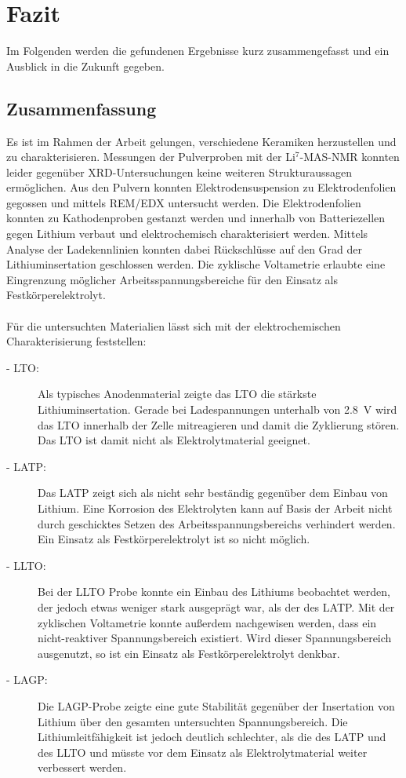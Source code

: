 \documentclass[a4paper, 11pt, headsepline,footsepline,twoside,abstract]{scrbook}
\begin{document}
\chapter{Fazit}
Im Folgenden werden die gefundenen Ergebnisse kurz zusammengefasst und ein Ausblick in die Zukunft gegeben.
\section{Zusammenfassung}
Es ist im Rahmen der Arbeit gelungen, verschiedene Keramiken herzustellen und zu charakterisieren. Messungen der Pulverproben mit der Li$^7$-MAS-NMR konnten leider gegenüber XRD-Untersuchungen keine weiteren Strukturaussagen ermöglichen. Aus den Pulvern konnten Elektrodensuspension zu Elektrodenfolien gegossen und mittels REM/EDX untersucht werden. Die Elektrodenfolien konnten zu Kathodenproben gestanzt werden und innerhalb von Batteriezellen gegen Lithium verbaut und elektrochemisch charakterisiert werden. Mittels Analyse der Ladekennlinien konnten dabei Rückschlüsse auf den Grad der Lithiuminsertation geschlossen werden. Die zyklische Voltametrie erlaubte eine Eingrenzung möglicher Arbeitsspannungsbereiche für den Einsatz als Festkörperelektrolyt. %
\\\\
Für die untersuchten Materialien lässt sich mit der elektrochemischen Charakterisierung feststellen:
\begin{description}
\item[- LTO:] Als typisches Anodenmaterial zeigte das LTO die stärkste Lithiuminsertation. Gerade bei Ladespannungen unterhalb von \SI{2.8}{\volt} wird das LTO innerhalb der Zelle mitreagieren und damit die Zyklierung stören. Das LTO ist damit nicht als Elektrolytmaterial geeignet.
\item[- LATP:] Das LATP zeigt sich als nicht sehr beständig gegenüber dem Einbau von Lithium. Eine Korrosion des Elektrolyten kann auf Basis der Arbeit nicht durch geschicktes Setzen des Arbeitsspannungsbereichs verhindert werden. Ein Einsatz als Festkörperelektrolyt ist so nicht möglich.
\item[- LLTO:] Bei der LLTO Probe konnte ein Einbau des Lithiums beobachtet werden, der jedoch etwas weniger stark ausgeprägt war, als der des LATP. Mit der zyklischen Voltametrie konnte außerdem nachgewisen werden, dass ein nicht-reaktiver Spannungsbereich existiert. Wird dieser Spannungsbereich ausgenutzt, so ist ein Einsatz als Festkörperelektrolyt denkbar.
\item[- LAGP:] Die LAGP-Probe zeigte eine gute Stabilität gegenüber der Insertation von Lithium über den gesamten untersuchten Spannungsbereich. Die Lithiumleitfähigkeit ist jedoch deutlich schlechter, als die des LATP und des LLTO und müsste vor dem Einsatz als Elektrolytmaterial weiter verbessert werden. 
\end{description}
\end{document}
